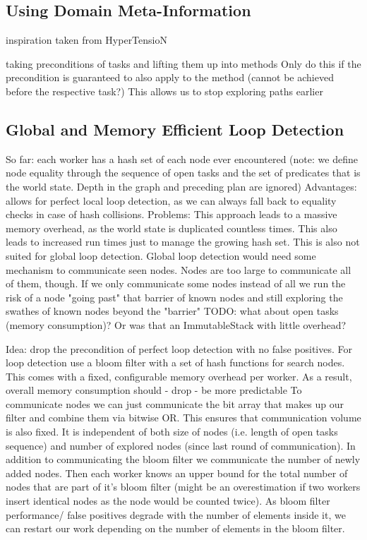 \subsection{Using Domain Meta-Information}
inspiration taken from HyperTensioN

taking preconditions of tasks and lifting them up into methods
Only do this if the precondition is guaranteed to also apply to the method (cannot be achieved before the respective task?)
This allows us to stop exploring paths earlier

\subsection{Global and Memory Efficient Loop Detection}
So far: each worker has a hash set of each node ever encountered (note: we define node equality through the sequence of open tasks and the set of predicates that is the world state. Depth in the graph and preceding plan are ignored)
Advantages: allows for perfect local loop detection, as we can always fall back to equality checks in case of hash collisions.
Problems: This approach leads to a massive memory overhead, as the world state is duplicated countless times. This also leads to increased run times just to manage the growing hash set.
This is also not suited for global loop detection. Global loop detection would need some mechanism to communicate seen nodes. Nodes are too large to communicate all of them, though. If we only communicate some nodes instead of all we run the risk of a node "going past" that barrier of known nodes and still exploring the swathes of known nodes beyond the "barrier"
TODO: what about open tasks (memory consumption)? Or was that an ImmutableStack with little overhead?

Idea: drop the precondition of perfect loop detection with no false positives.
For loop detection use a bloom filter with a set of hash functions for search nodes.
This comes with a fixed, configurable memory overhead per worker. As a result, overall memory consumption should
- drop
- be more predictable
To communicate nodes we can just communicate the bit array that makes up our filter and combine them via bitwise OR. This ensures that communication volume is also fixed. It is independent of both size of nodes (i.e. length of open tasks sequence) and number of explored nodes (since last round of communication).
In addition to communicating the bloom filter we communicate the number of newly added nodes. Then each worker knows an upper bound for the total number of nodes that are part of it's bloom filter (might be an overestimation if two workers insert identical nodes as the node would be counted twice). As bloom filter performance/ false positives degrade with the number of elements inside it, we can restart our work depending on the number of elements in the bloom filter.

